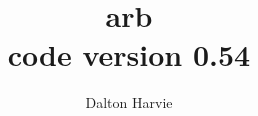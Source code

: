 %
% 
% 
% 
% 
% 
% 
% 
%




\title{arb\\[1ex]\large{code version 0.54}}
\author{Dalton Harvie}

\maketitle



